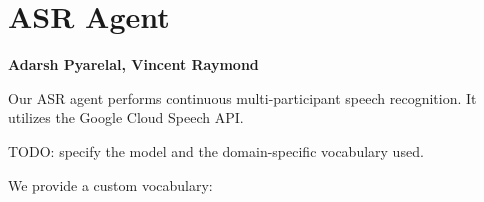 \chapter{ASR Agent}
\label{ch:asr}
\textbf{Adarsh Pyarelal, Vincent Raymond}

Our ASR agent performs continuous multi-participant speech recognition. It
utilizes the Google Cloud Speech API. 

TODO: specify the model and the domain-specific vocabulary used.

We provide a custom vocabulary:
